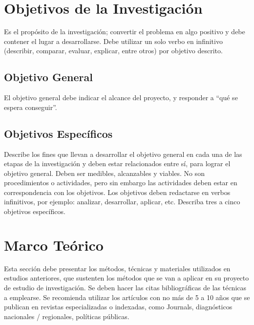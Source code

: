 \documentclass[12pt,a4paper]{article}
\begin{document}
\section{Objetivos de la Investigación}
\noindent
Es el propósito de la investigación; convertir el problema en algo positivo y debe
contener el lugar a desarrollarse. Debe utilizar un solo verbo en infinitivo (describir,
comparar, evaluar, explicar, entre otros) por objetivo descrito.

\subsection*{Objetivo General}
\noindent
El objetivo general debe
indicar el alcance del proyecto, y responder a “qué se espera conseguir”.

\subsection*{Objetivos Específicos}
\noindent
Describe los fines que llevan a desarrollar el objetivo general en cada una de las
etapas de la investigación y deben estar relacionados entre sí, para lograr el objetivo
general. Deben ser medibles, alcanzables y viables. No son procedimientos o
actividades, pero sin embargo las actividades deben estar en correspondencia con
los objetivos. Los objetivos deben redactarse en verbos infinitivos, por ejemplo:
analizar, desarrollar, aplicar, etc. Describa tres a cinco objetivos específicos.

\section{Marco Teórico}
\noindent
Esta sección debe presentar los métodos, técnicas y materiales utilizados en
estudios anteriores, que sustenten los métodos que se van a aplicar en su proyecto
de estudio de investigación. Se deben hacer las citas bibliográficas de las técnicas a emplearse. Se recomienda utilizar los artículos con no más de 5 a 10 años que se
publican en revistas especializadas o indexadas, como Journals, diagnósticos
nacionales / regionales, políticas públicas.
\end{document}
